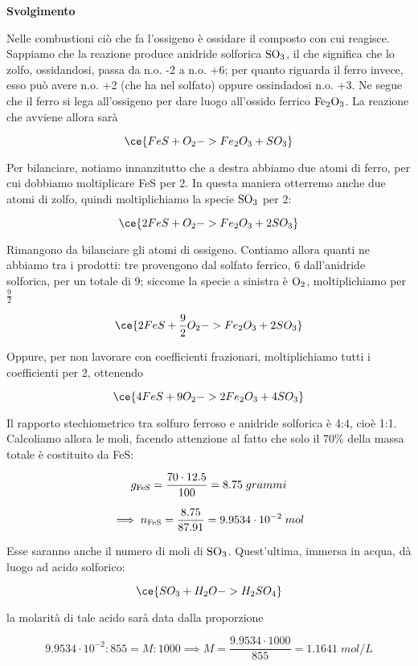 \vspace{0.2cm}\large\textbf{Svolgimento}\normalsize

\vspace{0.2cm}Nelle combustioni ciò che fa l'ossigeno è ossidare il composto con cui reagisce. Sappiamo che la reazione produce anidride solforica $\rm SO_3$, il che significa che lo zolfo, ossidandosi, passa da n.o. -2 a n.o. +6; per quanto riguarda il ferro invece, esso può avere n.o. +2 (che ha nel solfato) oppure ossindadosi n.o. +3. Ne segue che il ferro si lega all'ossigeno per dare luogo all'ossido ferrico $\rm Fe_2O_3$. La reazione che avviene allora sarà

$$\ce{FeS + O_2 -> Fe_2O_3 + SO_3}$$

Per bilanciare, notiamo innanzitutto che a destra abbiamo due atomi di ferro, per cui dobbiamo moltiplicare FeS per 2. In questa maniera otterremo anche due atomi di zolfo, quindi moltiplichiamo la specie $\rm SO_3$ per 2:

$$\ce{2FeS + O_2 -> Fe_2O_3 + 2SO_3}$$

Rimangono da bilanciare gli atomi di ossigeno. Contiamo allora quanti ne abbiamo tra i prodotti: tre provengono dal solfato ferrico, 6 dall'anidride solforica, per un totale di 9; siccome la specie a sinistra è $\rm O_2$, moltiplichiamo per $\frac{9}{2}$

$$\ce{2FeS + \frac{9}{2}O_2 -> Fe_2O_3 + 2SO_3}$$

Oppure, per non lavorare con coefficienti frazionari, moltiplichiamo tutti i coefficienti per 2, ottenendo

$$\ce{4FeS + 9O_2 -> 2Fe_2O_3 + 4SO_3}$$

Il rapporto stechiometrico tra solfuro ferroso e anidride solforica è 4:4, cioè 1:1. Calcoliamo allora le moli, facendo attenzione al fatto che solo il 70\% della massa totale è costituito da FeS:

$$g_{\rm FeS}=\frac{70 \cdot 12.5}{100}=8.75\;grammi$$

$$\implies
n_{\rm FeS}=\frac{8.75}{87.91}=9.9534 \cdot 10^{-2}\;mol$$

Esse saranno anche il numero di moli di $\rm SO_3$. Quest'ultima, immersa in acqua, dà luogo ad acido solforico:

$$\ce{SO_3 + H_2O -> H_2SO_4}$$

la molarità di tale acido sarà data dalla proporzione

$$9.9534 \cdot 10^{-2}:855=M:1000
\implies
M=\frac{9.9534 \cdot 1000}{855}=1.1641\;mol/L$$

